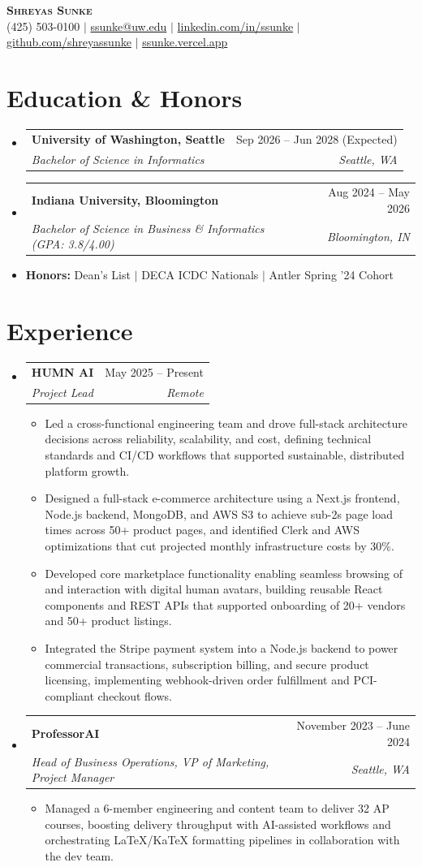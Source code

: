 \documentclass[letterpaper,11pt]{article}
\makeatletter
\newcommand{\resumeItem}[1]{\item\small{#1 \vspace{-2pt}}}
\newcommand{\resumeSubheading}[4]{\vspace{-2pt}\item\begin{tabular*}{0.97\textwidth}[t]{l@{\extracolsep{\fill}}r}\textbf{#1} & #2 \\\textit{\small#3} & \textit{\small #4} \\\end{tabular*}\vspace{-7pt}}
\newcommand{\resumeSubHeadingListStart}{\begin{itemize}[leftmargin=0.15in, label={}]}
\newcommand{\resumeSubHeadingListEnd}{\end{itemize}}
\newcommand{\resumeItemListStart}{\begin{itemize}}
\newcommand{\resumeItemListEnd}{\end{itemize}\vspace{-5pt}}
\makeatother
\begin{document}
\begin{center}
    \textbf{\Huge \scshape Shreyas Sunke} \\ \vspace{1pt}
    \small (425) 503-0100 $|$ \href{mailto:ssunke@uw.edu}{ssunke@uw.edu} $|$
    \href{https://linkedin.com/in/ssunke}{linkedin.com/in/ssunke} $|$
    \href{https://github.com/shreyassunke}{github.com/shreyassunke} $|$
    \href{https://ssunke.vercel.app/}{ssunke.vercel.app}
\end{center}

\section{Education \& Honors}
  \resumeSubHeadingListStart
    \resumeSubheading
      {University of Washington, Seattle}{Sep 2026 -- Jun 2028 (Expected)}
      {Bachelor of Science in Informatics}{Seattle, WA}
    \resumeSubheading
      {Indiana University, Bloomington}{Aug 2024 -- May 2026}
      {Bachelor of Science in Business \& Informatics (GPA: 3.8/4.00)}{Bloomington, IN}
    \item \small{\textbf{Honors:} Dean's List $|$ DECA ICDC Nationals $|$ Antler Spring '24 Cohort}
  \resumeSubHeadingListEnd

\section{Experience}
  \resumeSubHeadingListStart
    \resumeSubheading
      {HUMN AI}{May 2025 -- Present}
      {Project Lead}{Remote}
      \resumeItemListStart
        \resumeItem{Led a cross-functional engineering team and drove full-stack architecture decisions across reliability, scalability, and cost, defining technical standards and CI/CD workflows that supported sustainable, distributed platform growth.}
        \resumeItem{Designed a full-stack e-commerce architecture using a Next.js frontend, Node.js backend, MongoDB, and AWS S3 to achieve sub-2s page load times across 50+ product pages, and identified Clerk and AWS optimizations that cut projected monthly infrastructure costs by 30\%.}
        \resumeItem{Developed core marketplace functionality enabling seamless browsing of and interaction with digital human avatars, building reusable React components and REST APIs that supported onboarding of 20+ vendors and 50+ product listings.}
        \resumeItem{Integrated the Stripe payment system into a Node.js backend to power commercial transactions, subscription billing, and secure product licensing, implementing webhook-driven order fulfillment and PCI-compliant checkout flows.}
      \resumeItemListEnd
    \resumeSubheading
      {ProfessorAI}{November 2023 -- June 2024}
      {Head of Business Operations, VP of Marketing, Project Manager}{Seattle, WA}
      \resumeItemListStart
        \resumeItem{Managed a 6-member engineering and content team to deliver 32 AP courses, boosting delivery throughput with AI-assisted workflows and orchestrating LaTeX/KaTeX formatting pipelines in collaboration with the dev team.}
      \resumeItemListEnd
  \resumeSubHeadingListEnd
\end{document}
